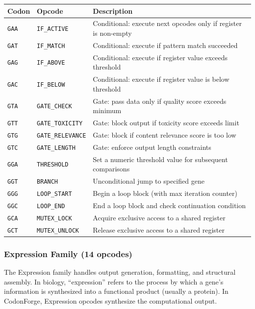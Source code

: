 \begin{center}
\renewcommand{\arraystretch}{1.1}
\small
\begin{tabularx}{0.97\textwidth}{L{1.2cm} L{3.2cm} Y}
\toprule
\textbf{Codon} & \textbf{Opcode} & \textbf{Description} \\
\midrule
\texttt{GAA} & \texttt{IF\_ACTIVE} & Conditional: execute next opcodes only if register is non-empty \\
\texttt{GAT} & \texttt{IF\_MATCH} & Conditional: execute if pattern match succeeded \\
\texttt{GAG} & \texttt{IF\_ABOVE} & Conditional: execute if register value exceeds threshold \\
\texttt{GAC} & \texttt{IF\_BELOW} & Conditional: execute if register value is below threshold \\
\texttt{GTA} & \texttt{GATE\_CHECK} & Gate: pass data only if quality score exceeds minimum \\
\texttt{GTT} & \texttt{GATE\_TOXICITY} & Gate: block output if toxicity score exceeds limit \\
\texttt{GTG} & \texttt{GATE\_RELEVANCE} & Gate: block if content relevance score is too low \\
\texttt{GTC} & \texttt{GATE\_LENGTH} & Gate: enforce output length constraints \\
\texttt{GGA} & \texttt{THRESHOLD} & Set a numeric threshold value for subsequent comparisons \\
\texttt{GGT} & \texttt{BRANCH} & Unconditional jump to specified gene \\
\texttt{GGG} & \texttt{LOOP\_START} & Begin a loop block (with max iteration counter) \\
\texttt{GGC} & \texttt{LOOP\_END} & End a loop block and check continuation condition \\
\texttt{GCA} & \texttt{MUTEX\_LOCK} & Acquire exclusive access to a shared register \\
\texttt{GCT} & \texttt{MUTEX\_UNLOCK} & Release exclusive access to a shared register \\
\bottomrule
\end{tabularx}
\end{center}

\subsubsection{Expression Family (14 opcodes)}

The Expression family handles output generation, formatting, and structural assembly. In biology, ``expression'' refers to the process by which a gene's information is synthesized into a functional product (usually a protein). In CodonForge, Expression opcodes synthesize the computational output.

